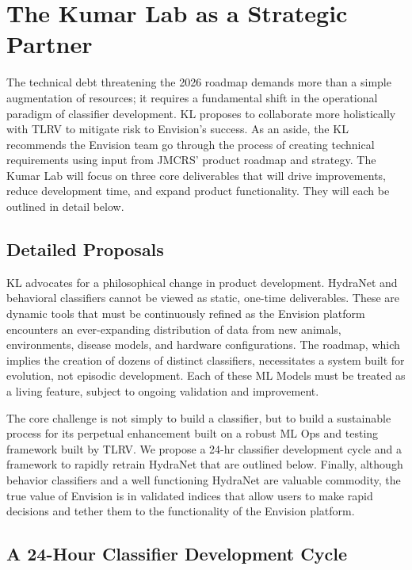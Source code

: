\documentclass[11pt,onecolumn]{article}
\begin{document}
\section{The Kumar Lab as a Strategic Partner}

The technical debt threatening the 2026 roadmap demands more than a simple augmentation of resources; it requires a fundamental shift in the operational paradigm of classifier development. KL proposes to collaborate more holistically with TLRV to mitigate risk to Envision's success. As an aside, the KL recommends the Envision team go through the process of creating technical requirements using input from JMCRS' product roadmap and strategy. The Kumar Lab will focus on three core deliverables that will drive improvements, reduce development time, and expand product functionality. They will each be outlined in detail below.

\subsection{Detailed Proposals}

KL advocates for a philosophical change in product development. HydraNet and behavioral classifiers cannot be viewed as static, one-time deliverables. These are dynamic tools that must be continuously refined as the Envision platform encounters an ever-expanding distribution of data from new animals, environments, disease models, and hardware configurations. The roadmap, which implies the creation of dozens of distinct classifiers, necessitates a system built for evolution, not episodic development. Each of these ML Models must be treated as a living feature, subject to ongoing validation and improvement. 

The core challenge is not simply to build a classifier, but to build a sustainable process for its perpetual enhancement built on a robust ML Ops and testing framework built by TLRV. We propose a 24-hr classifier development cycle and a framework to rapidly retrain HydraNet that are outlined below. Finally, although behavior classifiers and a well functioning HydraNet are valuable commodity, the true value of Envision is in validated indices that allow users to make rapid decisions and tether them to the functionality of the Envision platform.

\subsection{A 24-Hour Classifier Development Cycle}
\end{document}

